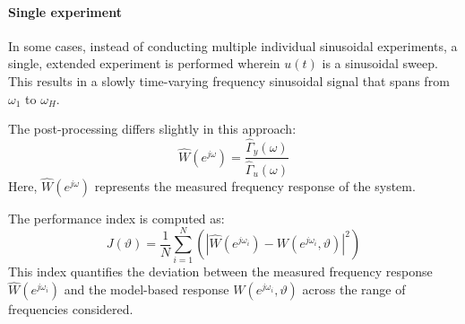 \paragraph*{Single experiment}
In some cases, instead of conducting multiple individual sinusoidal experiments, a single, extended experiment is performed wherein $u(t)$ is a sinusoidal sweep. 
This results in a slowly time-varying frequency sinusoidal signal that spans from $\omega_1$ to $\omega_H$.

The post-processing differs slightly in this approach:
\[\hat{W}(e^{j\omega})=\dfrac{\hat{\Gamma}_y(\omega)}{\hat{\Gamma}_u(\omega)}\]
Here, $\hat{W}(e^{j\omega})$ represents the measured frequency response of the system.

The performance index is computed as:
\[J(\vartheta)=\dfrac{1}{N}\sum_{i=1}^{N}\left(\left\lvert \hat{W}(e^{j\omega_i})-W(e^{j\omega_i},\vartheta)\right\rvert^2\right)\]
This index quantifies the deviation between the measured frequency response $\hat{W}(e^{j\omega_i})$ and the model-based response $W(e^{j\omega_i},\vartheta)$ across the range of frequencies considered.